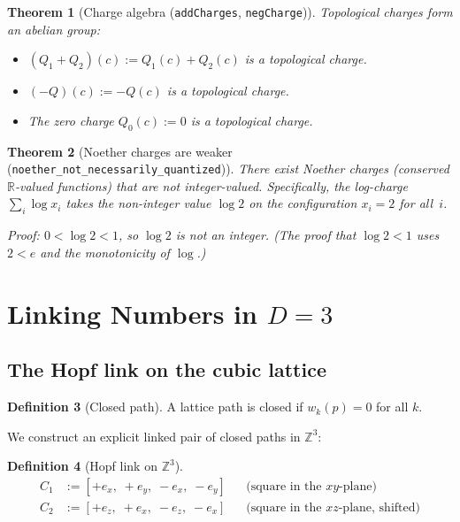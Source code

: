 \documentclass[11pt,a4paper]{article}
\theoremstyle{plain}
\newtheorem{theorem}{Theorem}[section]
\theoremstyle{definition}
\newtheorem{definition}[theorem]{Definition}
\theoremstyle{remark}
\newcommand{\R}{\mathbb{R}}
\newcommand{\Z}{\mathbb{Z}}
\begin{document}
\begin{theorem}[Charge algebra {\normalfont(\texttt{addCharges}, \texttt{negCharge})}]
\label{thm:charge-algebra}
Topological charges form an abelian group:
\begin{itemize}[nosep]
\item $(Q_1 + Q_2)(c) := Q_1(c) + Q_2(c)$ is a topological charge.
\item $(-Q)(c) := -Q(c)$ is a topological charge.
\item The zero charge $Q_0(c) := 0$ is a topological charge.
\end{itemize}
\end{theorem}

\begin{theorem}[Noether charges are weaker {\normalfont(\texttt{noether\_not\_necessarily\_quantized})}]
\label{thm:noether-weaker}
There exist Noether charges (conserved $\R$-valued functions) that
are not integer-valued.  Specifically, the log-charge
$\sum_i \log x_i$ takes the non-integer value $\log 2$ on the
configuration $x_i = 2$ for all~$i$.

\emph{Proof:} $0 < \log 2 < 1$, so $\log 2$ is not an integer.
(The proof that $\log 2 < 1$ uses $2 < e$ and the monotonicity of $\log$.)
\end{theorem}

\section{Linking Numbers in $D = 3$}
\label{sec:linking}

\subsection{The Hopf link on the cubic lattice}

\begin{definition}[Closed path]
A lattice path is closed if $w_k(p) = 0$ for all $k$.
\end{definition}

We construct an explicit linked pair of closed paths in $\Z^3$:

\begin{definition}[Hopf link on $\Z^3$]
\label{def:hopf}
\begin{align*}
C_1 &:= [+e_x,\; +e_y,\; -e_x,\; -e_y]
  &&\text{(square in the $xy$-plane)}\\
C_2 &:= [+e_z,\; +e_x,\; -e_z,\; -e_x]
  &&\text{(square in the $xz$-plane, shifted)}
\end{align*}
\end{definition}
\end{document}
